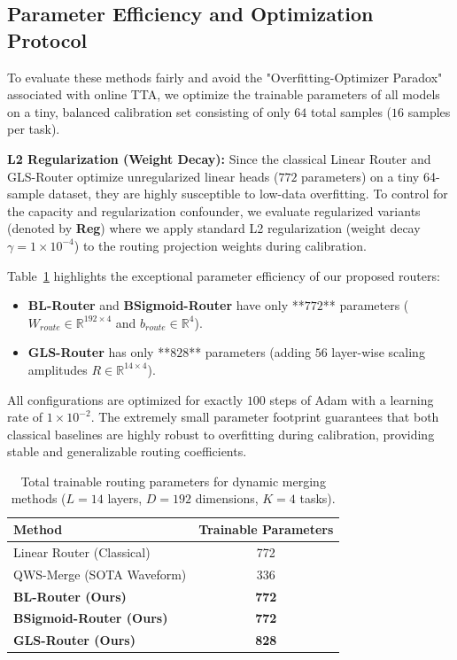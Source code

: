 \subsection{Parameter Efficiency and Optimization Protocol}
To evaluate these methods fairly and avoid the "Overfitting-Optimizer Paradox" associated with online TTA, we optimize the trainable parameters of all models on a tiny, balanced calibration set consisting of only $64$ total samples ($16$ samples per task). 

\textbf{L2 Regularization (Weight Decay):} Since the classical Linear Router and GLS-Router optimize unregularized linear heads ($772$ parameters) on a tiny 64-sample dataset, they are highly susceptible to low-data overfitting. To control for the capacity and regularization confounder, we evaluate regularized variants (denoted by \textbf{Reg}) where we apply standard L2 regularization (weight decay $\gamma = 1\times 10^{-4}$) to the routing projection weights during calibration.

Table~\ref{tab:param_efficiency} highlights the exceptional parameter efficiency of our proposed routers:
\begin{itemize}
    \item \textbf{BL-Router} and \textbf{BSigmoid-Router} have only **$772$** parameters ($W_{route} \in \mathbb{R}^{192 \times 4}$ and $b_{route} \in \mathbb{R}^4$).
    \item \textbf{GLS-Router} has only **$828$** parameters (adding $56$ layer-wise scaling amplitudes $R \in \mathbb{R}^{14 \times 4}$).
\end{itemize}
All configurations are optimized for exactly $100$ steps of Adam with a learning rate of $1\times 10^{-2}$. The extremely small parameter footprint guarantees that both classical baselines are highly robust to overfitting during calibration, providing stable and generalizable routing coefficients.

\begin{table}[h]
\centering
\caption{Total trainable routing parameters for dynamic merging methods ($L=14$ layers, $D=192$ dimensions, $K=4$ tasks).}
\label{tab:param_efficiency}
\begin{tabular}{lc}
\toprule
Method & Trainable Parameters \\
\midrule
Linear Router (Classical) & 772 \\
QWS-Merge (SOTA Waveform) & 336 \\
\textbf{BL-Router (Ours)} & \textbf{772} \\
\textbf{BSigmoid-Router (Ours)} & \textbf{772} \\
\textbf{GLS-Router (Ours)} & \textbf{828} \\
\bottomrule
\end{tabular}
\end{table}
